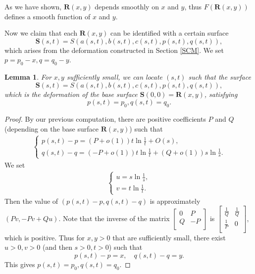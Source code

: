 \documentclass[11pt]{amsart}
\theoremstyle{plain}
\newtheorem{Lemma}[Theorem]{Lemma}
\newcommand{\TS}{\mathbf{S}}
\newcommand{\TR}{\mathbf{R}}
\begin{document}
 
As we have shown, 
 $\TR(x,y)$ depends smoothly on $x$ and $y$, thus $F(\TR(x,y))$ defines a smooth function of $x$ and $y$. 

Now we claim that each $\TR(x,y)$ can be identified  with a certain surface
$$\TS(s,t)=S\left(a(s,t), b(s,t),c(s,t), p(s,t), q(s,t)\right),$$  which arises from 
the  deformation constructed in Section \ref{SCM}. 
We set $p=p_0-x, q=q_0-y$.

\begin{Lemma}\label{lem:locate}
For $x,y$ sufficiently small, we can locate $(s,t)$ such that the surface $$\TS(s,t)=S\left(a(s,t), b(s,t),c(s,t), p(s,t), q(s,t)\right),$$ which is the deformation of the base surface $\TS(0,0)=\TR(x,y)$,
satisfying 
$$p(s,t)=p_0, q(s,t)=q_0.$$
\end{Lemma}
\begin{proof}
By our previous computation, there are positive coefficients $P$ and $Q$ (depending on the base surface $\TR(x,y)$) such that 
\begin{eqnarray*}
\begin{cases}
  p(s,t)-p = \left(P+o(1)\right)  t\ln{\frac{1}{t}}+O(s), \\
 q(s,t)- q = \left(-P+o(1)\right)  t\ln{\frac{1}{t}}+ \left(Q+o(1)\right)  s\ln{\frac{1}{s}}.
\end{cases}
\end{eqnarray*}
We set
 \begin{eqnarray*}
\begin{cases}
 u = s\ln{\frac{1}{s}}, \\
 v = t\ln{\frac{1}{t}}.
\end{cases}
\end{eqnarray*}
Then the value of
 $\left( p(s,t)-p, q(s,t)-q\right)$
is approximately $\left( P v, -P v+ Qu \right)$. Note that the inverse of the matrix $\left[ {\begin{array}{cc}
    0 & P \\
    Q & -P \\
  \end{array} } \right]$ is  $\left[ {\begin{array}{cc}
    \frac{1}{Q} & \frac{1}{Q} \\
    \frac{1}{P} & 0 \\
  \end{array} } \right]$, which is positive. 
Thus for $x,y>0$ that are sufficiently small, there exist  $u>0, v>0$ (and then $s>0, t>0$) such that 
$$ p(s,t)-p=x, \quad q(s,t)-q =y.$$
This gives $p(s,t)=p_0, q(s,t)=q_0$.


\end{proof}
\end{document}
